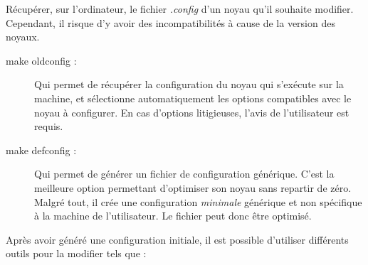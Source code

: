 ﻿\documentclass[17pts]{report}
\begin{document}
Récupérer, sur l'ordinateur, le fichier \textit{.config} d’un noyau qu'il
souhaite modifier. Cependant, il risque d’y avoir des incompatibilités à cause
de la version des noyaux.

\begin{description}
    \item[make oldconfig :] Qui permet de récupérer la configuration du noyau
        qui s'exécute sur la machine, et sélectionne automatiquement les
        options compatibles avec le noyau à configurer.  En cas d'options
        litigieuses, l'avis de l'utilisateur est requis.
    \item[make defconfig :] Qui permet de générer un fichier de configuration
        générique. C’est la meilleure option permettant d’optimiser son noyau
        sans repartir de zéro. Malgré tout, il crée une configuration
        \textit{minimale} générique et non spécifique à la machine de
        l’utilisateur.  Le fichier peut donc être optimisé.
\end{description}

Après avoir généré une configuration initiale, il est possible d’utiliser
différents outils pour la modifier tels que :
\end{document}
